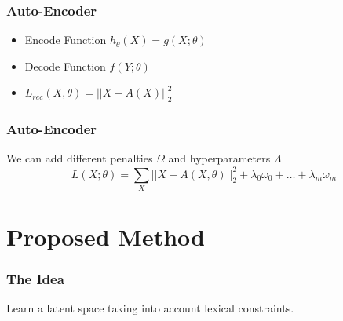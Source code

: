 \documentclass{beamer}
\begin{document}
\begin{frame}
  \frametitle{Auto-Encoder}
\begin{itemize}
  \setlength\itemsep{1em}
\item Encode Function $h_{\theta}(X) = g(X; \theta)$
\item Decode Function $f(Y; \theta)$
\item $L_{rec}(X, \theta) = || X - A(X)||_2^2$
\end{itemize}
  \begin{figure}[!h]
    \centering
    \label{fig:AE}
  \end{figure}
\end{frame}

\begin{frame}
  \frametitle{Auto-Encoder}
  We can add different penalties $\Omega$ and hyperparameters $\Lambda$
  \begin{equation*} 
    L(X;\theta) = \sum\limits_X|| X - A(X, \theta) ||_2^2 + \lambda_0 \omega_0 + 
    \ldots + \lambda_m \omega_m  
  \end{equation*}
\end{frame}

\section{Proposed Method}

\begin{frame}
\frametitle{The Idea}
Learn a latent space taking into account lexical constraints.
\end{frame}
\end{document}
